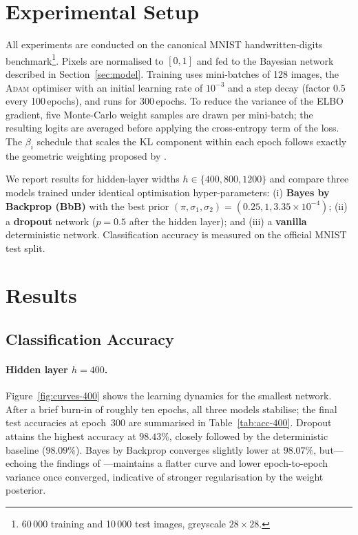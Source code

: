 \documentclass{article}
\begin{document}
\section{Experimental Setup}

All experiments are conducted on the canonical \textsc{MNIST} handwritten-digits benchmark\footnote{60\,000 training and 10\,000 test images, greyscale $28\times28$.}.  Pixels are normalised to $[0,1]$ and fed to the Bayesian network described in Section~\ref{sec:model}.  Training uses mini-batches of 128 images, the \textsc{Adam} optimiser with an initial learning rate of $10^{-3}$ and a step decay (factor $0.5$ every 100\,epochs), and runs for 300\,epochs.  To reduce the variance of the ELBO gradient, five Monte-Carlo weight samples are drawn per mini-batch; the resulting logits are averaged before applying the cross-entropy term of the loss.  The $\beta_i$ schedule that scales the KL component within each epoch follows exactly the geometric weighting proposed by \citet{blundell2015weight}.  

We report results for hidden-layer widths $h\in\{400,800,1200\}$ and compare three models trained under identical optimisation hyper-parameters:  
(i) \textbf{Bayes by Backprop (BbB)} with the best prior $(\pi,\sigma_1,\sigma_2)=(0.25,1,3.35\times10^{-4})$;  
(ii) a \textbf{dropout} network ($p=0.5$ after the hidden layer); and  
(iii) a \textbf{vanilla} deterministic network.  Classification accuracy is measured on the official MNIST test split.

\section{Results}

\subsection{Classification Accuracy}

\paragraph{Hidden layer $h=400$.}
Figure~\ref{fig:curves-400} shows the learning dynamics for the smallest network.  
After a brief burn-in of roughly ten epochs, all three models stabilise; the final test accuracies at epoch~300 are summarised in Table~\ref{tab:acc-400}.
Dropout attains the highest accuracy at $\mathbf{98.43\%}$, closely followed by the deterministic baseline ($98.09\%$).  
Bayes by Backprop converges slightly lower at $\mathbf{98.07\%}$, but—echoing the findings of \citet{blundell2015weight}—maintains a flatter curve and lower epoch-to-epoch variance once converged, indicative of stronger regularisation by the weight posterior.
\end{document}

